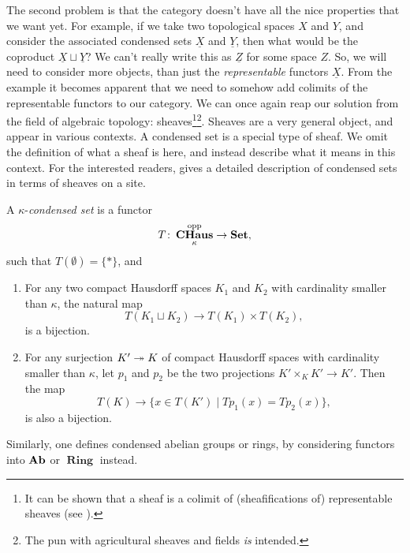 \documentclass{article}
\DeclareMathOperator{\opp}{opp}
\DeclareMathOperator{\CHaus}{\mathbf{CHaus}}
\DeclareMathOperator{\Ring}{\mathbf{Ring}}
\begin{document}
The second problem is that the category doesn't have all
the nice properties that we want yet. For example,
if we take two topological spaces $X$ and $Y$, and
consider the associated condensed sets $\underline{X}$
and $\underline{Y}$, then what would be the coproduct
$\underline{X} \sqcup \underline{Y}$? We can't
really write this as $\underline{Z}$ for some space $Z$.
So, we will need to consider more objects, than just
the \emph{representable} functors $\underline{X}$.
From the example it becomes apparent that we need
to somehow add colimits of the representable functors
to our category. We can once again reap our solution from
the field of algebraic topology: sheaves\footnote{
    It can be shown that a sheaf is a colimit of (sheafifications of) representable
    sheaves (see
    \cite[\href{https://stacks.math.columbia.edu/tag/0GLW}{Lemma 0GLW}]{stacks-project}).
}\footnote{
    The pun with agricultural sheaves and fields \emph{is} intended.
}. Sheaves are a very general object, and appear in various
contexts. A condensed set is a special type of sheaf.
We omit the definition of what a sheaf is here, and instead
describe what it means in this context. For the interested
readers, \cite[Section 1.2]{Dag2021FoundationsCM} gives
a detailed description of condensed sets in terms of sheaves
on a site.
\begin{definition}
    A $\kappa$-\emph{condensed set} is a functor
    \begin{equation*}
        T \colon \CHaus_{\kappa}^{\opp} \to \Set,
    \end{equation*}
    such that $T(\emptyset) = \{*\}$, and
    \begin{enumerate}
        \item For any two compact Hausdorff spaces $K_1$ and $K_2$ with cardinality
              smaller than $\kappa$, the natural map
              \begin{equation*}
                  T(K_1 \sqcup K_2) \to T(K_1) \times T(K_2),
              \end{equation*}
              is a bijection.
        \item For any surjection $K' \twoheadrightarrow K$ of compact Hausdorff spaces
              with cardinality smaller than $\kappa$, let $p_1$ and $p_2$
              be the two projections $K'\times_K K' \to K'$. Then the map
              \begin{equation*}
                  T(K) \to \{x \in T(K') \mid Tp_1(x) = Tp_2(x)\},
              \end{equation*}
              is also a bijection.
    \end{enumerate}
\end{definition}
Similarly, one defines condensed abelian groups or rings, by considering
functors into $\operatorname{\mathbf{Ab}}$ or $\Ring$ instead.
\end{document}
